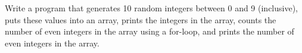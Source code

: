 Write a program that generates 10 random integers between 0 and 9 (inclusive), puts these values into an array, prints the integers in the array, counts the number of even integers in the array using a for-loop, and prints the number of even integers in the array.

